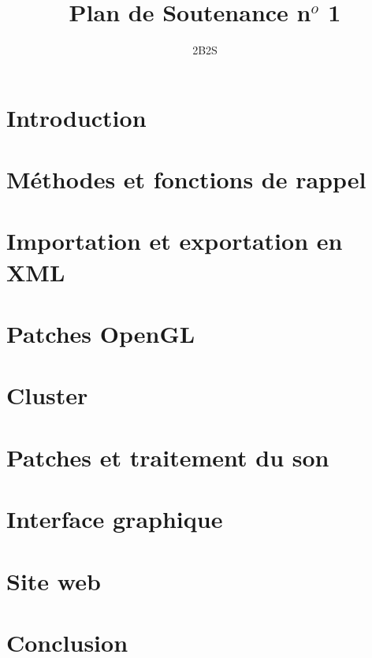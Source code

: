 \documentclass[14pt,a4paper]{article}
\title{\textbf{Plan de Soutenance n$^o$ 1}}
\author{2B2S}
\begin{document}
\maketitle
\rule{0cm}{1mm}
\section{Introduction}
\rule{0cm}{0cm}
\section{M\'ethodes et fonctions de rappel}
\rule{0cm}{0cm}
\section{Importation et exportation en XML}
\rule{0cm}{0cm}
\section{Patches OpenGL}
\rule{0cm}{0cm}
\section{Cluster}
\rule{0cm}{0cm}
\section{Patches et traitement du son}
\rule{0cm}{0cm}
\section{Interface graphique}
\rule{0cm}{0cm}
\section{Site web}
\rule{0cm}{0cm}
\section{Conclusion}
\end{document}
